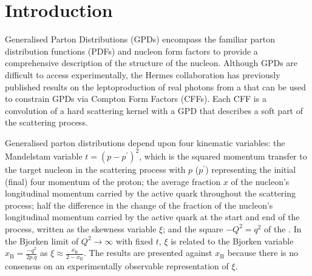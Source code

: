 \section{Introduction}
Generalised Parton Distributions (GPDs)
\cite{Mue94,Ji97a,Rad97} encompass the familiar parton
distribution functions (PDFs) and nucleon form factors to provide a
comprehensive description of the structure of the nucleon.
Although GPDs are difficult to access experimentally, the H{\sc ermes}
collaboration has previously published results
\cite{Air06,Air08,Air09,Air10,Air10a} on
the leptoproduction of real photons from a  that can be used to
constrain GPDs via Compton Form Factors (CFFs). Each CFF is a convolution of a
hard scattering kernel with a GPD that describes a soft part of the scattering
process.

Generalised parton distributions depend upon four kinematic variables: the
Mandelstam variable $t=(p-p^{\prime})^2$, which is the squared momentum
transfer to the target nucleon in the scattering process with $p$ ($p^{\prime}$)
representing the initial (final) four momentum of the proton; the average
fraction $x$ of the nucleon's longitudinal momentum carried by the active
quark throughout the scattering process; half the difference in the
change of the fraction of the nucleon's longitudinal momentum carried by the
active quark at the start and end of the process, written as the skewness
variable $\xi$; and the square $-Q^2=q^2$ of the . In the Bjorken limit of $Q^2\rightarrow\infty$ with
fixed $t$, $\xi$ is related to the Bjorken variable
$x_{\textrm{B}}=\frac{-q^2}{2p.q}$ as
$\xi\approx\frac{x_\textrm{B}}{2-x_\textrm{B}}$. The results are presented
against $x_{\textrm{B}}$ because there is no consensus on an experimentally
observable representation of $\xi$. 

